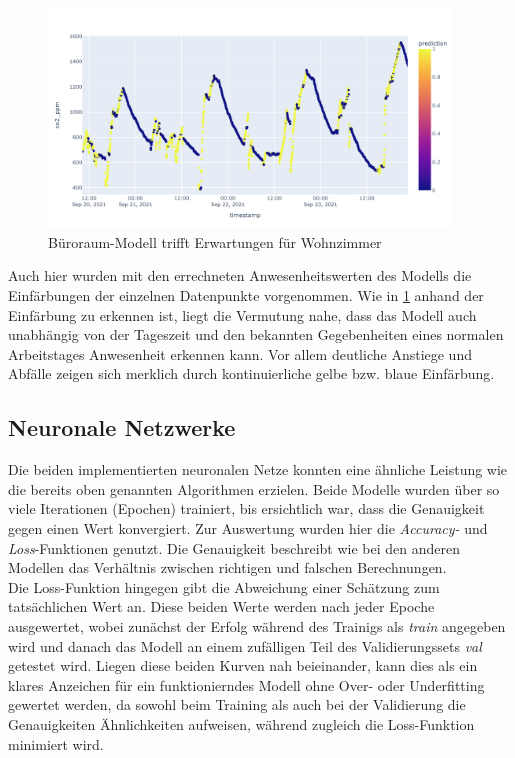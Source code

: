 \begin{figure}[h]
    \centering
    \includegraphics[width=0.95\textwidth]{pic/h217_predicting_livingroom.png}
    \caption{Büroraum-Modell trifft Erwartungen für Wohnzimmer}
    \label{fig:pred_livingroom}
\end{figure}

Auch hier wurden mit den errechneten Anwesenheitswerten des Modells die Einfärbungen der einzelnen Datenpunkte 
vorgenommen. 
Wie in \ref{fig:pred_livingroom} anhand der Einfärbung zu erkennen ist, liegt die Vermutung nahe, dass das Modell 
auch unabhängig von der Tageszeit und den bekannten Gegebenheiten eines normalen Arbeitstages Anwesenheit 
erkennen kann. Vor allem deutliche Anstiege und Abfälle zeigen sich merklich durch kontinuierliche gelbe bzw. 
blaue Einfärbung.
\newpage

\subsection{Neuronale Netzwerke}
Die beiden implementierten neuronalen Netze konnten eine ähnliche Leistung wie die bereits oben genannten 
Algorithmen erzielen. Beide Modelle wurden über so viele Iterationen (Epochen) trainiert, bis ersichtlich war,
dass die Genauigkeit gegen einen Wert konvergiert. Zur Auswertung wurden hier die \textit{Accuracy-} und 
\textit{Loss}-Funktionen genutzt. Die Genauigkeit beschreibt wie bei den anderen Modellen das Verhältnis
zwischen richtigen und falschen Berechnungen.\\
Die Loss-Funktion hingegen gibt die Abweichung einer Schätzung zum tatsächlichen Wert an. Diese beiden Werte 
werden nach jeder Epoche ausgewertet, wobei zunächst der Erfolg während des Trainigs als \textit{train}
angegeben wird und danach das Modell an einem zufälligen Teil des Validierungssets \textit{val} getestet wird.
Liegen diese beiden Kurven nah beieinander, kann dies als ein klares Anzeichen für ein funktionierndes Modell ohne 
Over- oder Underfitting gewertet werden, da sowohl beim Training als auch bei der Validierung die Genauigkeiten 
Ähnlichkeiten aufweisen, während zugleich die Loss-Funktion minimiert wird.

